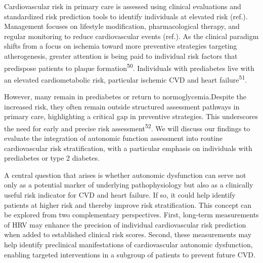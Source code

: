 \documentclass[
  a4paper,
  headsepline=true,
  open=any]{scrbook}
\begin{document}
Cardiovascular risk in primary care is assessed using clinical
evaluations and standardized risk prediction tools to identify
individuals at elevated risk (ref.). Management focuses on lifestyle
modification, pharmacological therapy, and regular monitoring to reduce
cardiovascular events (ref.). As the clinical paradigm shifts from a
focus on ischemia toward more preventive strategies targeting
atherogenesis, greater attention is being paid to individual risk
factors that predispose patients to plaque
formation\textsuperscript{50}. Individuals with prediabetes live with an
elevated cardiometabolic risk, particular ischemic CVD and heart
failure\textsuperscript{51}.

However, many remain in prediabetes or return to normoglycemia.Despite
the increased risk, they often remain outside structured assessment
pathways in primary care, highlighting a critical gap in preventive
strategies. This underscores the need for early and precise risk
assessment\textsuperscript{52}. We will discuss our findings to evaluate
the integration of autonomic function assessment into routine
cardiovascular risk stratification, with a particular emphasis on
individuals with prediabetes or type 2 diabetes.

A central question that arises is whether autonomic dysfunction can
serve not only as a potential marker of underlying pathophysiology but
also as a clinically useful risk indicator for CVD and heart failure. If
so, it could help identify patients at higher risk and thereby improve
risk stratification. This concept can be explored from two complementary
perspectives. First, long-term measurements of HRV may enhance the
precision of individual cardiovascular risk prediction when added to
established clinical risk scores. Second, these measurements may help
identify preclinical manifestations of cardiovascular autonomic
dysfunction, enabling targeted interventions in a subgroup of patients
to prevent future CVD.
\end{document}
